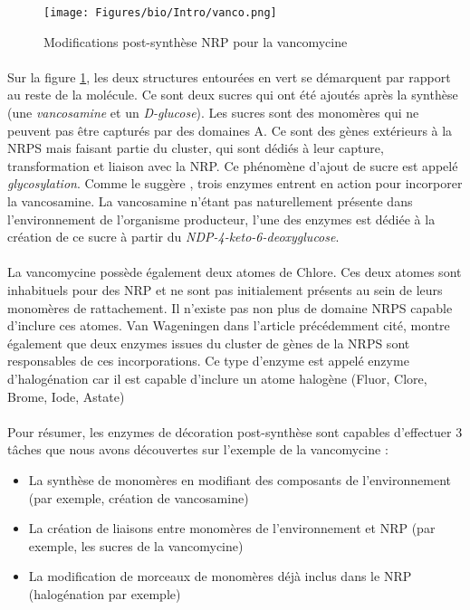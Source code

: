 \documentclass[12pt,french,twoside]{report}
\begin{document}
\begin{figure}[h!]
  \begin{center}
    \texttt{[image: Figures/bio/Intro/vanco.png]}
    \caption{\label{vanco}Modifications post-synthèse NRP pour la vancomycine}
  \end{center}
\end{figure}

\paragraph{}Sur la figure \ref{vanco}, les deux structures entourées en vert se démarquent par rapport au reste de la molécule.
Ce sont deux sucres qui ont été ajoutés après la synthèse (une \textit{vancosamine} et un \textit{D-glucose}).
Les sucres sont des monomères qui ne peuvent pas être capturés par des domaines A.
Ce sont des gènes extérieurs à la NRPS mais faisant partie du cluster, qui sont dédiés à leur capture, transformation et liaison avec la NRP.
Ce phénomène d'ajout de sucre est appelé \textit{glycosylation}.
Comme le suggère \cite{van_wageningen_sequencing_1998}, trois enzymes entrent en action pour incorporer la vancosamine.
La vancosamine n'étant pas naturellement présente dans l'environnement de l'organisme producteur, l'une des enzymes est dédiée à la création de ce sucre à partir du \textit{NDP-4-keto-6-deoxyglucose}.

\paragraph{}La vancomycine possède également deux atomes de Chlore.
Ces deux atomes sont inhabituels pour des NRP et ne sont pas initialement présents au sein de leurs monomères de rattachement.
Il n'existe pas non plus de domaine NRPS capable d'inclure ces atomes.
Van Wageningen dans l'article précédemment cité, montre également que deux enzymes issues du cluster de gènes de la NRPS sont responsables de ces incorporations.
Ce type d'enzyme est appelé enzyme d'halogénation car il est capable d'inclure un atome halogène (Fluor, Clore, Brome, Iode, Astate)

\paragraph{}Pour résumer, les enzymes de décoration post-synthèse sont capables d'effectuer 3 tâches que nous avons découvertes sur l'exemple de la vancomycine :
\begin{itemize}
  \item La synthèse de monomères en modifiant des composants de l'environnement (par exemple, création de vancosamine)
  \item La création de liaisons entre monomères de l'environnement et NRP (par exemple, les sucres de la vancomycine)
  \item La modification de morceaux de monomères déjà inclus dans le NRP (halogénation par exemple)
\end{itemize}
\end{document}
